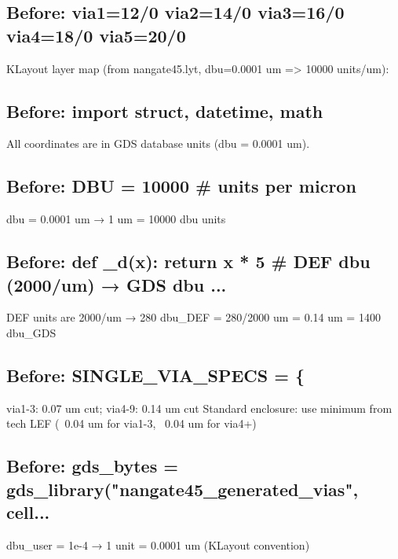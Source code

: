 \begin{record}

\subsection*{Before: via1=12/0  via2=14/0  via3=16/0  via4=18/0  via5=20/0}

\begin{textblock}
KLayout layer map (from nangate45.lyt, dbu=0.0001 um => 10000 units/um):
\end{textblock}

\subsection*{Before: import struct, datetime, math}

\begin{textblock}
All coordinates are in GDS database units (dbu = 0.0001 um).
\end{textblock}

\subsection*{Before: DBU = 10000  \# units per micron}

\begin{textblock}
dbu = 0.0001 um → 1 um = 10000 dbu units
\end{textblock}

\subsection*{Before: def \_d(x): return x * 5   \# DEF dbu (2000/um) → GDS dbu ...}

\begin{textblock}
DEF units are 2000/um → 280 dbu_DEF = 280/2000 um = 0.14 um = 1400 dbu_GDS
\end{textblock}

\subsection*{Before: SINGLE\_VIA\_SPECS = \{}

\begin{textblock}
via1-3: 0.07 um cut; via4-9: 0.14 um cut
Standard enclosure: use minimum from tech LEF (~0.04 um for via1-3, ~0.04 um for via4+)
\end{textblock}

\subsection*{Before: gds\_bytes = gds\_library("nangate45\_generated\_vias", cell...}

\begin{textblock}
dbu_user = 1e-4 → 1 unit = 0.0001 um (KLayout convention)
\end{textblock}

\end{record}

